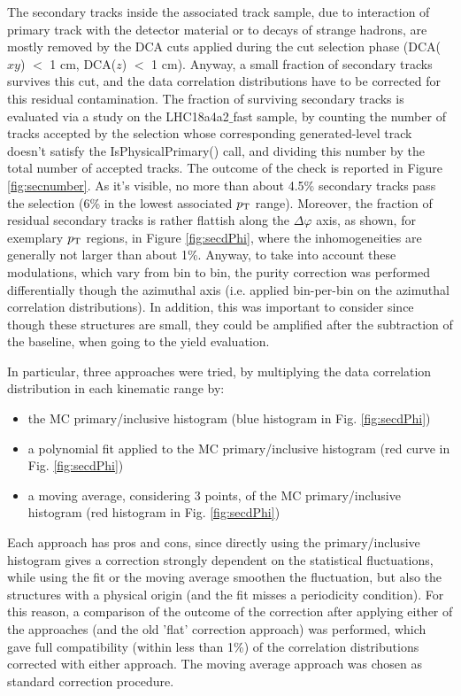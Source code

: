 \label{secondaries}
The secondary tracks inside the associated track sample, due to interaction of primary track with the detector material or to decays of strange hadrons, are mostly removed by the DCA cuts applied during the cut selection phase (DCA($xy$) $<$ 1 cm, DCA($z$) $<$ 1 cm).
Anyway, a small fraction of secondary tracks survives this cut, and the data correlation distributions have to be corrected for this residual contamination.
The fraction of surviving secondary tracks is evaluated via a study on the LHC18a4a2$\_$fast sample, by counting the number of tracks accepted by the selection whose corresponding generated-level track doesn't satisfy the IsPhysicalPrimary() call, and dividing this number by the total number of accepted tracks.
The outcome of the check is reported in Figure \ref{fig:secnumber}. As it's visible, no more than about 4.5\% secondary tracks pass the selection (6\% in the lowest associated $p_{\rm T}$ range). Moreover, the fraction of residual secondary tracks is rather flattish along the $\Delta\varphi$ axis, as shown, for exemplary $p_{\rm T}$ regions, in Figure \ref{fig:secdPhi}, where the inhomogeneities are generally not larger than about 1\%.
Anyway, to take into account these modulations, which vary from bin to bin, the purity correction was performed differentially though the azimuthal axis (i.e. applied bin-per-bin on the azimuthal correlation distributions). In addition, this was important to consider since though these structures are small, they could be amplified after the subtraction of the baseline, when going to the yield evaluation.

In particular, three approaches were tried, by multiplying the data correlation distribution in each kinematic range by:
\begin{itemize}
  \item the MC primary/inclusive histogram (blue histogram in Fig. \ref{fig:secdPhi})
  \item a polynomial fit applied to the MC primary/inclusive histogram (red curve in Fig. \ref{fig:secdPhi})
  \item a moving average, considering 3 points, of the MC primary/inclusive histogram (red histogram in Fig. \ref{fig:secdPhi})
\end{itemize}
Each approach has pros and cons, since directly using the primary/inclusive histogram gives a correction strongly dependent on the statistical fluctuations, while using the fit or the moving average smoothen the fluctuation, but also the structures with a physical origin (and the fit misses a periodicity condition).
For this reason, a comparison of the outcome of the correction after applying either of the approaches (and the old 'flat' correction approach) was performed, which gave full compatibility (within less than 1\%) of the correlation distributions corrected with either approach. The moving average approach was chosen as standard correction procedure.


